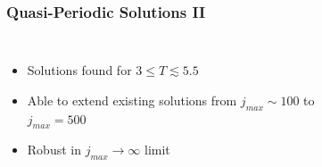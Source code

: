 \documentclass[mathserif,10pt]{beamer}
\newcommand{\bi}{\begin{itemize}}
\newcommand{\ei}{\end{itemize}}
\newcommand{\its}{\item}
\newcommand{\jm}{j_{max}}
\begin{document}
{\frame
{
  \frametitle{Quasi-Periodic Solutions II}
  \begin{columns}
  \bi
  \its Solutions found for $3 \leq T \lesssim 5.5$
  \its<2->{Able to extend existing solutions from $\jm \sim 100$ to $\jm = 500$}
  \its<2->{Robust in $\jm \to \infty$ limit}
  \ei
  \begin{figure}
  \centering

\end{figure}
\end{columns}}}
\end{document}
